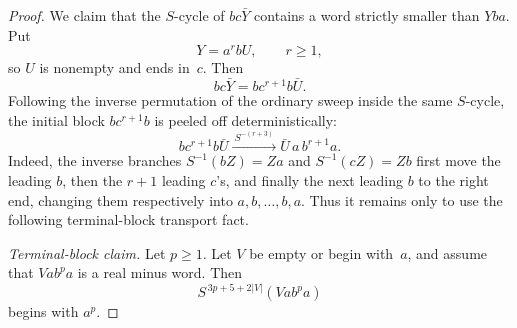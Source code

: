 \documentclass{amsart}
\theoremstyle{definition}
\theoremstyle{remark}
\begin{document}
\begin{proof}
We claim that the $S$-cycle of $bc\bar Y$ contains a word strictly
smaller than $Yba$.  Put
\[
  Y=a^r bU,\qquad r\ge1,
\]
so $U$ is nonempty and ends in~$c$.  Then
\[
  bc\bar Y=bc^{r+1}b\bar U .
\]
Following the inverse permutation of the ordinary sweep inside the
same $S$-cycle, the initial block $bc^{r+1}b$ is peeled off
deterministically:
\[
  bc^{r+1}b\bar U
  \xrightarrow{\ S^{-(r+3)}\ }
  \bar U\,a\,b^{r+1}a .                         \tag{1}
\]
Indeed, the inverse branches $S^{-1}(bZ)=Za$ and
$S^{-1}(cZ)=Zb$ first move the leading $b$, then the $r+1$ leading
$c$'s, and finally the next leading $b$ to the right end, changing
them respectively into $a,b,\ldots,b,a$.  Thus it remains only to use
the following terminal-block transport fact.

\smallskip\noindent
\emph{Terminal-block claim.}
Let $p\ge1$.  Let $V$ be empty or begin with~$a$, and assume that
$Vab^pa$ is a real minus word.  Then
\[
  S^{\,3p+5+2|V|}(Vab^pa)
\]
begins with $a^p$.


\end{proof}
\end{document}
